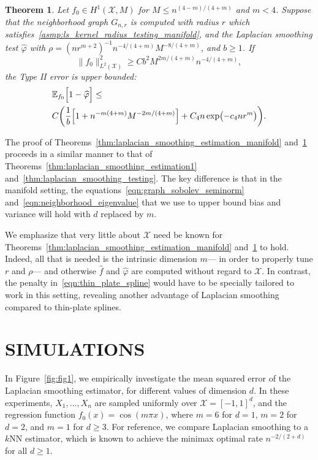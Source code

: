 \documentclass[twoside]{article}
\newcommand{\1}{\mathbf{1}}
\newcommand{\Xset}{\mathcal{X}}
\newcommand{\Leb}{L}
\newcommand{\Ebb}{\mathbb{E}}
\newcommand{\wh}[1]{\widehat{#1}}
\newtheorem{theorem}{Theorem}
\theoremstyle{definition}
\theoremstyle{remark}
\begin{document}
\begin{theorem}
	\label{thm:laplacian_smoothing_testing_manifold}
	Let $f_0 \in H^1(\Xset,M)$ for $M \leq n^{(4 - m)/(4 + m)}$ and $m < 4$. Suppose that the neighborhood graph $G_{n,r}$ is computed with radius $r$ which satisfies~\ref{asmp:ls_kernel_radius_testing_manifold}, and the Laplacian smoothing test $\wh{\varphi}$ with $\rho = (nr^{m + 2})^{-1} n^{-4/(4 + m)} M^{-8/(4 + m)}$, and $b \geq 1$. If
	\begin{equation}
	\label{eqn:laplacian_smoothing_testing_manifold}
	\bigl\|f_0\bigr\|_{\Leb^2(\Xset)}^2 \geq C b^2 M^{2m/(4 + m)} n^{-4/(4 + m)},
	\end{equation} 
	the Type II error is upper bounded:
	\begin{align*}
	& \Ebb_{f_0}\Bigl[1 - \wh{\varphi} \Bigr] \leq \\
	& C\biggl(\frac{1}{b}\Bigl[1 + n^{-m(4 + m)}M^{-2m/(4 + m)}\Bigr] + C_4n\exp\bigl(-c_4nr^m\bigr)\biggr).
	\end{align*}
\end{theorem}
The proof of Theorems~\ref{thm:laplacian_smoothing_estimation_manifold} and~\ref{thm:laplacian_smoothing_testing_manifold} proceeds in a similar manner to that of Theorems~\ref{thm:laplacian_smoothing_estimation1} and~\ref{thm:laplacian_smoothing_testing}. The key difference is that in the manifold setting, the equations~\eqref{eqn:graph_sobolev_seminorm} and~\eqref{eqn:neighborhood_eigenvalue} that we use to upper bound bias and variance will hold with $d$ replaced by $m$.

We emphasize that very little about $\Xset$ need be known for Theorems~\ref{thm:laplacian_smoothing_estimation_manifold} and~\ref{thm:laplacian_smoothing_testing_manifold} to hold. Indeed, all that is needed is the intrinsic dimension $m$--- in order to properly tune $r$ and $\rho$--- and otherwise $\wh{f}$ and $\wh{\varphi}$ are computed without regard to $\Xset$. In contrast, the penalty in~\eqref{eqn:thin_plate_spline} would have to be specially tailored to work in this setting, revealing another advantage of Laplacian smoothing compared to thin-plate splines.

\section{SIMULATIONS}
\label{sec:simulations}

In Figure~\ref{fig:fig1}, we empirically investigate the mean squared error of the Laplacian smoothing estimator, for different values of dimension $d$. In these experiments, $X_1,\ldots,X_n$ are sampled uniformly over $\Xset = [-1,1]^d$, and the regression function $f_0(x) = \cos(m \pi x)$, where $m = 6$ for $d = 1$, $m = 2$ for $d = 2$, and $m = 1$ for $d \geq 3$. For reference, we compare Laplacian smoothing to a $k$NN estimator, which is known to achieve the minimax optimal rate $n^{-2/(2+d)}$ for all $d \geq 1$.
\end{document}

